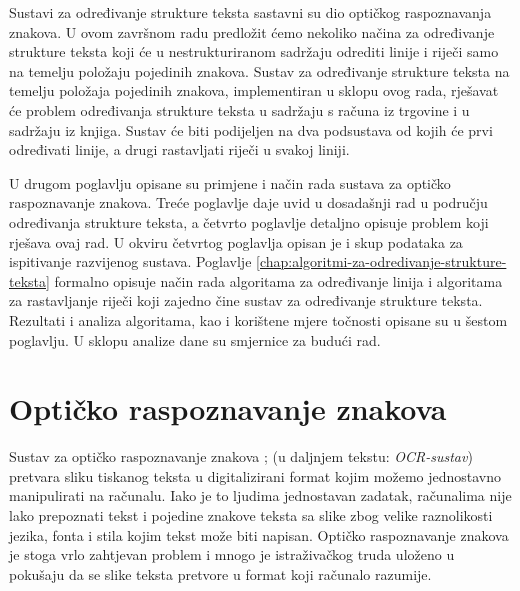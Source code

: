 \documentclass[times, utf8, zavrsni]{fer}
\begin{document}
Sustavi za određivanje strukture teksta sastavni su dio optičkog raspoznavanja
znakova. U ovom završnom radu predložit ćemo nekoliko načina za određivanje
strukture teksta koji će u nestrukturiranom sadržaju odrediti linije i riječi
samo na temelju položaju pojedinih znakova. Sustav za određivanje strukture
teksta na temelju položaja pojedinih znakova, implementiran u sklopu ovog rada,
rješavat će problem određivanja strukture teksta u sadržaju s računa iz
trgovine i u sadržaju iz knjiga. Sustav će biti podijeljen na dva podsustava od
kojih će prvi određivati linije, a drugi rastavljati riječi u svakoj liniji.

U drugom poglavlju opisane su primjene i način rada sustava za optičko
raspoznavanje znakova. Treće poglavlje daje uvid u dosadašnji rad u području
određivanja strukture teksta, a četvrto poglavlje detaljno opisuje problem koji
rješava ovaj rad. U okviru četvrtog poglavlja opisan je i skup
podataka za ispitivanje razvijenog sustava. Poglavlje
\ref{chap:algoritmi-za-odredivanje-strukture-teksta} formalno opisuje način rada
algoritama za određivanje linija i algoritama za rastavljanje riječi koji
zajedno čine sustav za određivanje strukture teksta. Rezultati i analiza
algoritama, kao i korištene mjere točnosti opisane su u šestom poglavlju. U
sklopu analize dane su smjernice za budući rad.
















\chapter{Optičko raspoznavanje znakova}
\label{chap:opticko-raspoznavanje-znakova}
Sustav za optičko raspoznavanje znakova ; (u
daljnjem tekstu: \emph{OCR-sustav})
pretvara sliku tiskanog teksta u digitalizirani format kojim možemo jednostavno
manipulirati na računalu.
Iako je to ljudima jednostavan zadatak, računalima nije lako prepoznati tekst i
pojedine znakove teksta sa slike
zbog velike raznolikosti jezika, fonta i stila kojim tekst može biti napisan.
Optičko raspoznavanje znakova je stoga vrlo zahtjevan problem i mnogo je
istraživačkog truda uloženo u pokušaju
da se slike teksta pretvore u format koji računalo razumije.
\citep{DBLP:journals/corr/abs-1710-05703}
\end{document}
